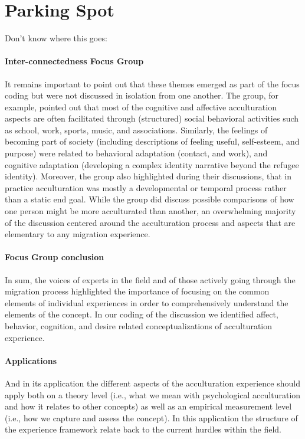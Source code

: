 \documentclass[man, 12pt, a4paper]{apa7}
\begin{document}
\newpage
\section{Parking Spot}
Don't know where this goes:

\paragraph{Inter-connectedness Focus Group}
It remains important to point out that these themes emerged as part of the focus coding but were not discussed in isolation from one another. The group, for example, pointed out that most of the cognitive and affective acculturation aspects are often facilitated through (structured) social behavioral activities such as school, work, sports, music, and associations. Similarly, the feelings of becoming part of society (including descriptions of feeling useful, self-esteem, and purpose) were related to behavioral adaptation (contact, and work), and cognitive adaptation (developing a complex identity narrative beyond the refugee identity). Moreover, the group also highlighted during their discussions, that in practice acculturation was mostly a developmental or temporal process rather than a static end goal. While the group did discuss possible comparisons of how one person might be more acculturated than another, an overwhelming majority of the discussion centered around the acculturation process and aspects that are elementary to any migration experience. 

\paragraph{Focus Group conclusion}
In sum, the voices of experts in the field and of those actively going through the migration process highlighted the importance of focusing on the common elements of individual experiences in order to comprehensively understand the elements of the concept. In our coding of the discussion we identified affect, behavior, cognition, and desire related conceptualizations of acculturation experience.

\paragraph{Applications}
And in its application the different aspects of the acculturation experience should apply both on a theory level (i.e., what we mean with psychological acculturation and how it relates to other concepts) as well as an empirical measurement level (i.e., how we capture and assess the concept). In this application the structure of the experience framework relate back to the current hurdles within the field.
\end{document}
